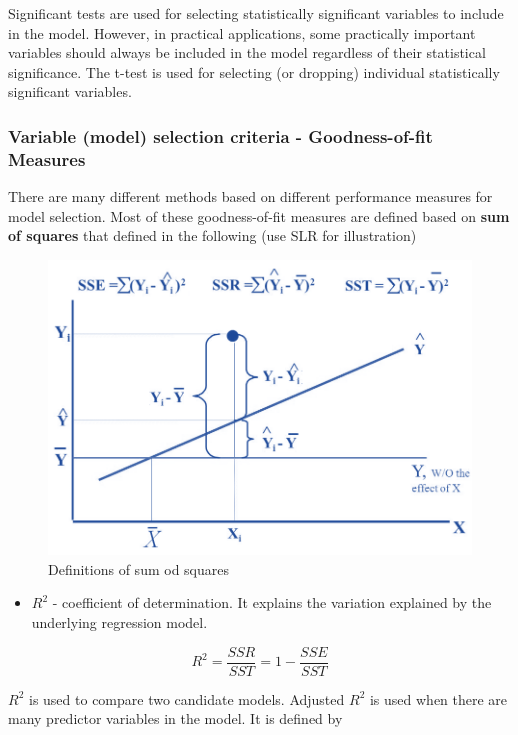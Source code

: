 \documentclass[
]{book}
\providecommand{\tightlist}{%
  \setlength{\itemsep}{0pt}\setlength{\parskip}{0pt}}
\begin{document}
Significant tests are used for selecting statistically significant variables to include in the model. However, in practical applications, some practically important variables should always be included in the model regardless of their statistical significance. The t-test is used for selecting (or dropping) individual statistically significant variables.

\hypertarget{variable-model-selection-criteria---goodness-of-fit-measures}{%
\subsubsection{Variable (model) selection criteria - Goodness-of-fit Measures}\label{variable-model-selection-criteria---goodness-of-fit-measures}}

There are many different methods based on different performance measures for model selection. Most of these goodness-of-fit measures are defined based on \textbf{sum of squares} that defined in the following (use SLR for illustration)

\begin{figure}

{\centering \includegraphics[width=0.6\linewidth]{img04/w04-SSS} 

}

\caption{Definitions of sum od squares}\label{fig:unnamed-chunk-77}
\end{figure}

\begin{itemize}
\tightlist
\item
  \(R^2\) - coefficient of determination. It explains the variation explained by the underlying regression model.
\end{itemize}

\[
R^2 = \frac{SSR}{SST} = 1 - \frac{SSE}{SST}
\]

\(R^2\) is used to compare two candidate models. Adjusted \(R^2\) is used when there are many predictor variables in the model. It is defined by
\end{document}
